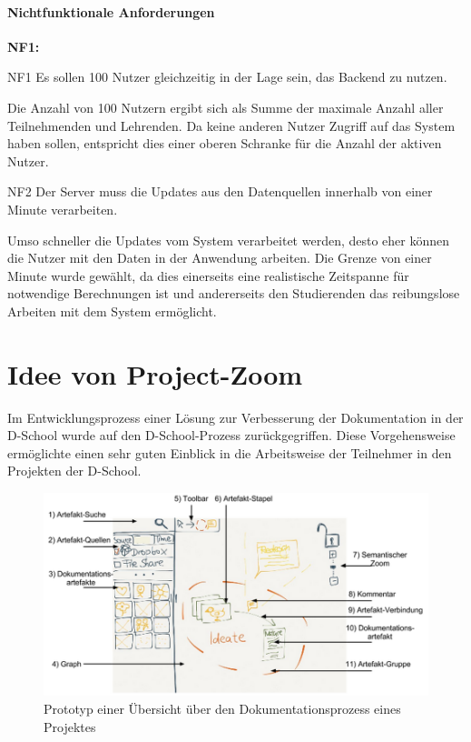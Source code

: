 \paragraph{Nichtfunktionale Anforderungen}
\label{sec:nonfunctional}

\begin{labeling}{\textbf{NF1:}}
  \item[NF1\label{itm:nf1}] Es sollen 100 Nutzer gleichzeitig in der Lage sein, das \gls{Backend} zu nutzen.

  Die Anzahl von 100 Nutzern ergibt sich als Summe der maximale Anzahl aller Teilnehmenden und Lehrenden. Da keine anderen Nutzer Zugriff auf das System haben sollen, entspricht dies einer oberen Schranke für die Anzahl der aktiven Nutzer. 

  \item[NF2\label{itm:nf2}]  Der Server muss die Updates aus den Datenquellen innerhalb von einer Minute verarbeiten.

  Umso schneller die Updates vom System verarbeitet werden, desto eher können die Nutzer mit den Daten in der Anwendung arbeiten. Die Grenze von einer Minute wurde gewählt, da dies einerseits eine realistische Zeitspanne für notwendige Berechnungen ist und andererseits den Studierenden das reibungslose Arbeiten mit dem System ermöglicht.
\end{labeling}


\section{Idee von Project-Zoom}
 
Im Entwicklungsprozess einer Lösung zur Verbesserung der Dokumentation in der D-School wurde auf den D-School-Prozess zurückgegriffen. Diese Vorgehensweise ermöglichte einen sehr guten Einblick in die Arbeitsweise der Teilnehmer in den Projekten der D-School. 

\begin{figure}[ht]  
  \centering     
  \includegraphics[width=1.0\textwidth]{img/projectzoom_prototype.png}  
   \caption{Prototyp einer Übersicht über den Dokumentationsprozess eines Projektes}
  \label{fig:projectzoom_prototype} 
\end{figure}

